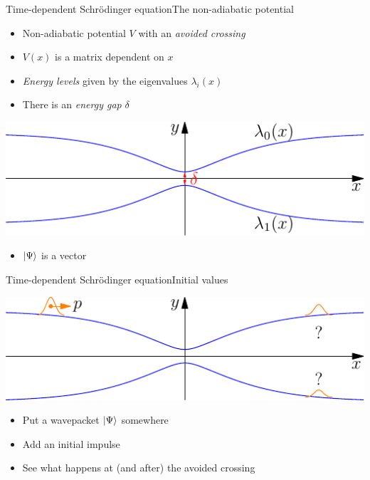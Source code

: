 \documentclass{beamer}
\begin{document}
\begin{frame}{Time-dependent Schrödinger equation}{The non-adiabatic potential}
  \begin{itemize}
  \item Non-adiabatic potential $V$ with an \emph{avoided crossing}
  \item $V\left( x\right)$ is a matrix dependent on $x$
  \item \emph{Energy levels} given by the eigenvalues $\lambda_i\left( x\right)$
  \item There is an \emph{energy gap} $\delta$
  \end{itemize}
  \begin{center}
    \includegraphics[scale=0.8]{./potential.pdf}
  \end{center}
  \begin{itemize}
  \item $\Ket{\Psi}$ is a vector
  \end{itemize}
\end{frame}


\begin{frame}{Time-dependent Schrödinger equation}{Initial values}
  \begin{center}
    \includegraphics[scale=0.8]{./iv.pdf}
  \end{center}
  \begin{itemize}
  \item Put a wavepacket $\Ket{\Psi}$ somewhere
  \item Add an initial impulse
  \item See what happens at (and after) the avoided crossing
  \end{itemize}
\end{frame}
\end{document}
